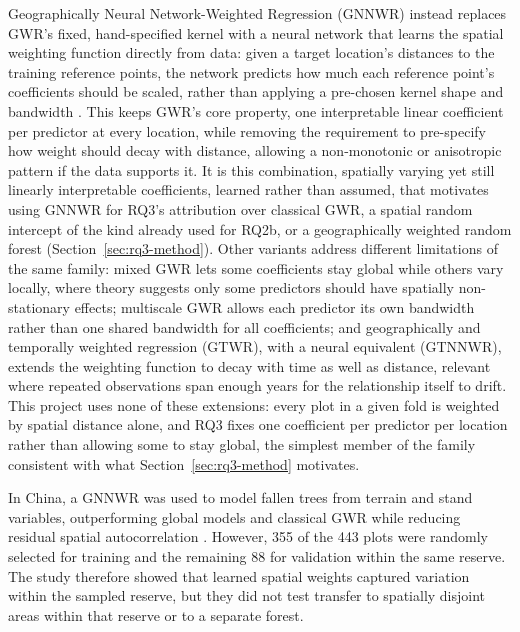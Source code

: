 \documentclass[logo,msc,ai]{infthesis}           %
\begin{document}
Geographically Neural Network-Weighted Regression (GNNWR) instead replaces GWR's fixed, hand-specified kernel with a neural network that learns the spatial weighting function directly from data: given a target location's distances to the training reference points, the network predicts how much each reference point's coefficients should be scaled, rather than applying a pre-chosen kernel shape and bandwidth \cite{du2020Geographically_C6_GWR}. This keeps GWR's core property, one interpretable linear coefficient per predictor at every location, while removing the requirement to pre-specify how weight should decay with distance, allowing a non-monotonic or anisotropic pattern if the data supports it. It is this combination, spatially varying yet still linearly interpretable coefficients, learned rather than assumed, that motivates using GNNWR for RQ3's attribution over classical GWR, a spatial random intercept of the kind already used for RQ2b, or a geographically weighted random forest (Section~\ref{sec:rq3-method}). Other variants address different limitations of the same family: mixed GWR lets some coefficients stay global while others vary locally, where theory suggests only some predictors should have spatially non-stationary effects; multiscale GWR allows each predictor its own bandwidth rather than one shared bandwidth for all coefficients; and geographically and temporally weighted regression (GTWR), with a neural equivalent (GTNNWR), extends the weighting function to decay with time as well as distance, relevant where repeated observations span enough years for the relationship itself to drift. This project uses none of these extensions: every plot in a given fold is weighted by spatial distance alone, and RQ3 fixes one coefficient per predictor per location rather than allowing some to stay global, the simplest member of the family consistent with what Section~\ref{sec:rq3-method} motivates.

In China, a GNNWR was used to model fallen trees from terrain and stand variables, outperforming global models and classical GWR while reducing residual spatial autocorrelation \cite{sun2022Local_C6_GWR}. However, 355 of the 443 plots were randomly selected for training and the remaining 88 for validation within the same reserve. The study therefore showed that learned spatial weights captured variation within the sampled reserve, but they did not test transfer to spatially disjoint areas within that reserve or to a separate forest.

\end{document}
